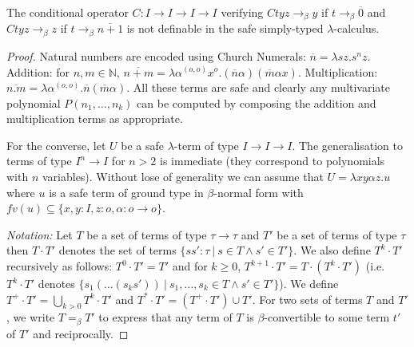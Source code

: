 \documentclass{llncs}
\newcommand{\encode}[1]{\overline{#1}} \newcommand\dps{\displaystyle}
\newcommand\union{\cup}
\newcommand\Union{\bigcup}
\newcommand\nat{\mathbb{N}}
\begin{document}
\begin{corollary}
The conditional operator $C:I\rightarrow I\rightarrow I \rightarrow I$ verifying  $C t y z \rightarrow_\beta y$  if $t \rightarrow_\beta \encode{0}$ and $C t y z \rightarrow_\beta z$ if $t \rightarrow_\beta \encode{n+1}$ is not definable in the safe simply-typed $\lambda$-calculus.
\end{corollary}
\begin{proof}
Natural numbers are encoded using Church Numerals: $\encode{n} = \lambda s z. s^n z$.
Addition: for $n,m \in \nat$, $\encode{n+m} = \lambda \alpha^{(o,o)} x^o . (\encode{n} \alpha) (\encode{m} \alpha x)$. Multiplication: $\encode{n . m} = \lambda \alpha^{(o,o)} . \encode{n} (\encode{m} \alpha)$.
All these terms are safe and clearly any multivariate polynomial $P(n_1, \ldots, n_k)$ can be computed by composing the addition and multiplication terms as appropriate.

For the converse, let $U$ be a safe $\lambda$-term of type
$I\rightarrow I\rightarrow I$.  The generalisation to terms of type
$I^n \rightarrow I$ for $n>2$ is immediate (they correspond to
polynomials with $n$ variables). Without lose of generality we can
assume that $U = \lambda x y \alpha z. u$ where $u$ is a safe term of
ground type in $\beta$-normal form with $fv(u) \subseteq \{ x, y : I,
z :o, \alpha : o\rightarrow o \}$.

\emph{Notation:} Let $T$ be a set of terms of type $\tau \rightarrow \tau$ and $T'$ be a set of terms of type $\tau$ then $T \cdot T'$ denotes the set of terms $\{ s s' : \tau \ | \ s \in T \wedge s' \in T' \}$. We also define
$T^k \cdot T'$ recursively as follows:  $T^0 \cdot T' = T'$ and
for $k\geq 0$, $T^{k+1} \cdot T' = T \cdot (T^k \cdot T')$ (i.e. $T^k \cdot T'$ denotes $\{ s_1( \ldots (s_k s'))  \ | \ s_1, \ldots, s_k \in T \wedge s' \in T' \}$). We define $T^+\cdot T' = \Union_{k > 0} T^k \cdot T'$ and
$T^*\cdot T' = (T^+\cdot T') \union T'$.
For two sets of terms $T$ and $T'$, we write $T =_\beta T'$ to express that any term of $T$ is $\beta$-convertible to some term $t'$ of $T'$ and reciprocally.


\end{proof}
\end{document}
